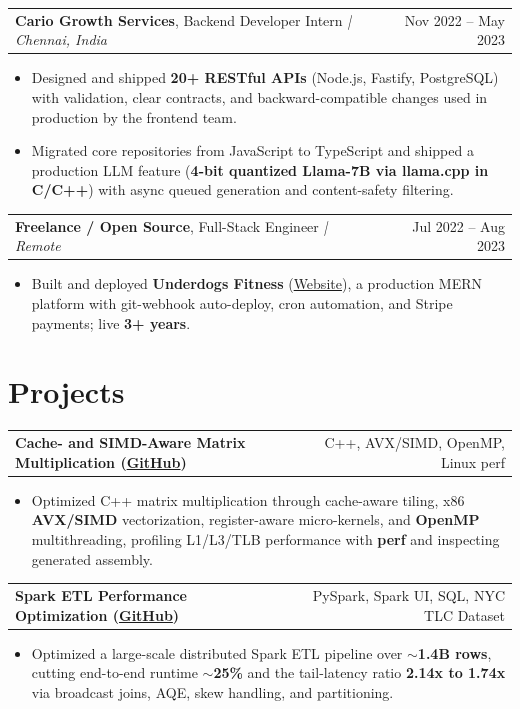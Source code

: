 \documentclass[letterpaper,11pt]{article}
\makeatletter
\newcommand{\expItem}[4]{%
  \vspace{3pt}
  \begin{tabular*}{\textwidth}{@{}l@{\extracolsep{\fill}}r@{}}
    \textbf{#1}, #2 \textit{| #3} & #4 \\
  \end{tabular*}\par\vspace{-2pt}
}
\newcommand{\projItem}[2]{%
  \vspace{6pt}
  \begin{tabular*}{\textwidth}{@{}l@{\extracolsep{\fill}}r@{}}
    \textbf{#1} & #2 \\
  \end{tabular*}\par\vspace{-2pt}
}
\makeatother
\begin{document}
\expItem{Cario Growth Services}{Backend Developer Intern}{Chennai, India}{Nov 2022 -- May 2023}
\begin{itemize}
  \item Designed and shipped \textbf{20+ RESTful APIs} (Node.js, Fastify, PostgreSQL) with validation, clear contracts, and backward-compatible changes used in production by the frontend team.
  \item Migrated core repositories from JavaScript to TypeScript and shipped a production LLM feature (\textbf{4-bit quantized Llama-7B via llama.cpp in C/C++}) with async queued generation and content-safety filtering.
\end{itemize}

\expItem{Freelance / Open Source}{Full-Stack Engineer}{Remote}{Jul 2022 -- Aug 2023}
\begin{itemize}
  \item Built and deployed \textbf{Underdogs Fitness} (\href{https://www.underdogsfitness.in/}{Website}), a production MERN platform with git-webhook auto-deploy, cron automation, and Stripe payments; live \textbf{3+ years}.
\end{itemize}

\section{Projects}

\projItem{Cache- and SIMD-Aware Matrix Multiplication {\normalfont\small(\href{https://github.com/Deva-1903/cs690pf}{GitHub})}}{C++, AVX/SIMD, OpenMP, Linux perf}
\begin{itemize}
  \item Optimized C++ matrix multiplication through cache-aware tiling, x86 \textbf{AVX/SIMD} vectorization, register-aware micro-kernels, and \textbf{OpenMP} multithreading, profiling L1/L3/TLB performance with \textbf{perf} and inspecting generated assembly.
\end{itemize}

\projItem{Spark ETL Performance Optimization {\normalfont\small(\href{https://github.com/Deva-1903/Spark-ETL-Optimization}{GitHub})}}{PySpark, Spark UI, SQL, NYC TLC Dataset}
\begin{itemize}
  \item Optimized a large-scale distributed Spark ETL pipeline over \textbf{$\sim$1.4B rows}, cutting end-to-end runtime \textbf{$\sim$25\%} and the tail-latency ratio \textbf{2.14x to 1.74x} via broadcast joins, AQE, skew handling, and partitioning.
\end{itemize}
\end{document}
